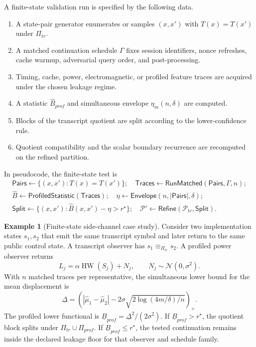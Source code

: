 \documentclass[11pt]{article}
\theoremstyle{definition}
\newtheorem{example}[definition]{Example}
\theoremstyle{plain}
\theoremstyle{remark}
\begin{document}
A finite-state validation run is specified by the following data.
\begin{enumerate}[leftmargin=2em]
\item A state-pair generator enumerates or samples $(x,x')$ with $T(x)=T(x')$ under $\Pi_{tr}$.
\item A matched continuation schedule $\Gamma$ fixes session identifiers, nonce refreshes, cache warmup, adversarial query order, and post-processing.
\item Timing, cache, power, electromagnetic, or profiled feature traces are acquired under the chosen leakage regime.
\item A statistic $\widehat B_{prof}$ and simultaneous envelope $\eta_m(n,\delta)$ are computed.
\item Blocks of the transcript quotient are split according to the lower-confidence rule.
\item Quotient compatibility and the scalar boundary recurrence are recomputed on the refined partition.
\end{enumerate}
In pseudocode, the finite-state test is
\[
\begin{array}{l}
\textsf{Pairs}\leftarrow\{(x,x'):T(x)=T(x')\};\quad
\textsf{Traces}\leftarrow\textsf{RunMatched}(\textsf{Pairs},\Gamma,n);\\
\widehat B\leftarrow\textsf{ProfiledStatistic}(\textsf{Traces});\quad
\eta\leftarrow\textsf{Envelope}(n,|\textsf{Pairs}|,\delta);\\
\textsf{Split}\leftarrow\{(x,x'):\widehat B(x,x')-\eta>r^\star\};\quad
\mathcal P'\leftarrow\textsf{Refine}(\mathcal P_{tr},\textsf{Split}).
\end{array}
\]

\begin{example}[Finite-state side-channel case study]
Consider two implementation states $s_1,s_2$ that emit the same transcript symbol and later return to the same public control state. A transcript observer has $s_1\equiv_{\Pi_{tr}}s_2$. A profiled power observer returns
\[
L_j=\alpha\operatorname{HW}(S_j)+N_j,
\qquad N_j\sim\mathcal N(0,\sigma^2).
\]
With $n$ matched traces per representative, the simultaneous lower bound for the mean displacement is
\[
\underline\Delta=\left(|\widehat\mu_1-\widehat\mu_2|-2\sigma\sqrt{2\log(4m/\delta)/n}\right)_+.
\]
The profiled lower functional is $\underline B_{prof}=\underline\Delta^2/(2\sigma^2)$. If $\underline B_{prof}>r^\star$, the quotient block splits under $\Pi_{tr}\cup\Pi_{prof}$. If $\underline B_{prof}\le r^\star$, the tested continuation remains inside the declared leakage floor for that observer and schedule family.
\end{example}
\end{document}
